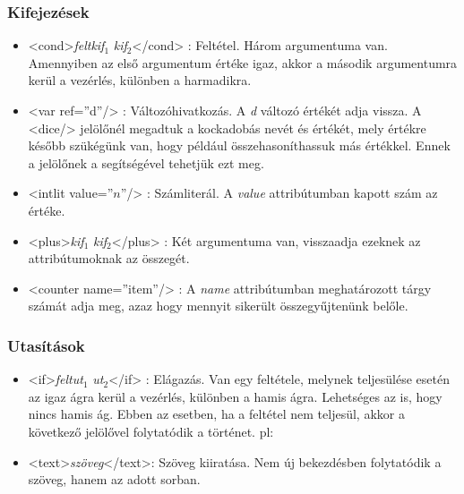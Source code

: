 \documentclass[12pt,a4paper,oneside]{report}
\newcommand{\xtag}[1]{{\color{Tag}#1}}
\newcommand{\xattr}[2]{{\color{Attr}#1}={\color{Value}''#2''}}
\newcommand{\attr}{\emph}
\newcommand{\kif}{\emph{kif}}
\newcommand{\felt}{\emph{felt}}
\newcommand{\ut}{\emph{ut}}
\begin{document}
      \subsubsection{Kifejezések}
        \begin{itemize}
          \item <\xtag{cond}>\felt \kif$_1$ \kif$_2$<\xtag{/cond}> : Feltétel. Három
            argumentuma van. Amennyiben az első argumentum értéke igaz,
            akkor a második argumentumra kerül a vezérlés, különben a
            harmadikra.
          \item <\xtag{var} \xattr{ref}{d}/>
            : Változóhivatkozás. A \emph{d} változó értékét adja
            vissza. A <\xtag{dice}/> jelölőnél megadtuk a kockadobás nevét és
            értékét, mely értékre később szükégünk van, hogy például
            összehasoníthassuk más értékkel. Ennek a jelölőnek a
            segítségével tehetjük ezt meg.
            
          \item <\xtag{intlit} \xattr{value}{$n$}/>
            : Számliterál. A
            \attr{value} attribútumban kapott szám az értéke.
    
          \item <\xtag{plus}>\kif$_1$ \kif$_2$<\xtag{/plus}> : Két argumentuma
            van, visszaadja ezeknek az attribútumoknak az összegét.

          \item <\xtag{counter}
            {\color{Attr}name}={\color{Value}''item''}/> : A \attr{name}
            attribútumban meghatározott tárgy számát adja meg, azaz hogy
            mennyit sikerült összegyűjtenünk belőle.
            
        \end{itemize}

      \subsubsection{Utasítások}
        \begin{itemize}
          \item <\xtag{if}>\felt \ut$_1$ \ut$_2$<\xtag{/if}> : Elágazás. Van egy
            feltétele, melynek teljesülése esetén az igaz ágra kerül a
            vezérlés, különben a hamis ágra. Lehetséges az is, hogy nincs
            hamis ág. Ebben az esetben, ha a feltétel nem teljesül, akkor
            a következő jelölővel folytatódik a történet.  pl:

          \item <\xtag{text}>\emph{szöveg}<\xtag{/text}>: Szöveg
            kiiratása. Nem új bekezdésben folytatódik a szöveg, hanem az
            adott sorban.
      \end{itemize}
\end{document}
